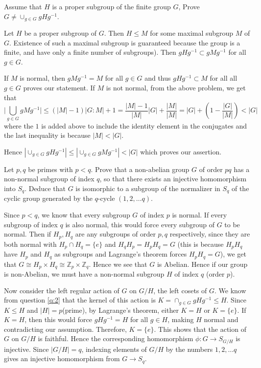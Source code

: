 \documentclass[12pt]{exam}
\theoremstyle{plain} %
\theoremstyle{definition} %
\theoremstyle{remark} %
\begin{document}
\begin{questions}
  \question
  Assume that $H$ is a proper subgroup of the finite group $G$, Prove
  $G \neq \cup_{g \in G}gHg^{-1}$.
  \begin{solution}
    Let $H$ be a proper subgroup of $G$. Then $H \leqslant M$ for
    some maximal subgroup $M$ of $G$. Existence of such a maximal
    subgroup is guaranteed because the group
  is a finite, and have only a finite number of subgroups).
  Then $gHg^{-1} \subset gMg^{-1}$ for all $g \in G$.

  If $M$ is normal, then $gMg^{-1} = M$ for all $g \in G$ and thus $gHg^{-1}
  \subset M$ for all all $g \in G$ proves our statement.
  If $M$ is not normal, from the above problem, we get that \[
    \big|\bigcup_{g \in G}gMg^{-1}\big| \le (|M| - 1)|G:M| + 1 =
    \frac{|M|-1}{|M|}|G| + \frac{|M|}{|M|} = |G| + (1 - \frac{|G|}{|M|}) < |G|
  \]
  where the $1$ is added above to include the identity element in
  the conjugates and the last inequality is because $|M| < |G|$.

  Hence $|\cup_{g \in G}gHg^{-1}| \le |\cup_{g \in G}gMg^{-1}| <
  |G|$ which proves our assertion.
\end{solution}

\question
Let $p, q$ be primes with $p < q$. Prove that a non-abelian group $G$
of order $pq$ has a non-normal subgroup of index $q$, so that there
exists an injective homomorphism into $S_q$. Deduce that $G$ is
isomorphic to a subgroup of the normalizer in $S_q$ of the cyclic
group generated by the $q$-cycle $(1, 2, \ldots q)$.
\begin{solution}
  Since $p < q$, we know that every subgroup $G$ of index $p$ is
  normal. If every subgroup of index $q$ is also normal, this would
  force every subgroup of $G$ to be normal. Then if $H_p, H_q$ are
  any subgroups of order $p, q$ respectively, since they are both
  normal with $H_p \cap H_q = \{ e \}$ and $H_qH_p = H_pH_q = G$
  (this is because $H_pH_q$ have $H_p$ and $H_q$ as subgroups and
  Lagrange's theorem forces $H_pH_q = G$), we get that $G \cong H_p
  \times H_q \cong \mathbb{Z}_p \times \mathbb{Z}_q$. Hence we see
  that $G$ is Abelian. Hence if our group is non-Abelian, we must have a
  non-normal subgroup $H$ of index $q$ (order $p$).

  Now consider the left regular action of $G$ on $G/H$, the left
  cosets of $G$. We know from question \ref{q:2} that the kernel of
  this action is $K = \cap_{g \in G}gHg^{-1} \leqslant H$. Since $K
  \leqslant H$ and $|H| = p$(prime), by Lagrange's theorem, either $K
  = H$ or $K = \{ e \}$.
  If $K = H$, then this would force $gHg^{-1} = H$ for all $g \in H$,
  making $H$ normal and contradicting our assumption. Therefore, $K =
  \{ e \}$. This shows that the action of $G$ on $G/H$ is faithful.
  Hence the corresponding homomorphism $\phi:G \to S_{G/H}$ is injective.
  Since $|G/H| = q$, indexing elements of $G/H$ by the numbers $1, 2,
  \ldots q$ gives an injective homomorphism from $G \to S_q$.


\end{solution}
\end{questions}
\end{document}
